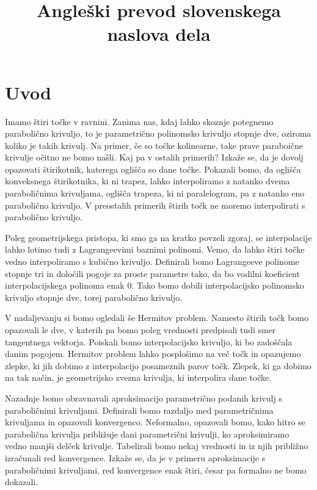 \documentclass[mat1]{fmfdelo}
\title{Angleški prevod slovenskega naslova dela}
\begin{document}

\section{Uvod}

Imamo štiri točke v ravnini. Zanima nas, kdaj lahko skoznje potegnemo parabolično krivuljo, to je parametrično polinomsko krivuljo stopnje dve, oziroma koliko je takih krivulj. Na primer, če so točke kolinearne, take prave paraboične krivulje očitno ne bomo našli. Kaj pa v ostalih primerih? Izkaže se, da je dovolj opazovati štirikotnik, katerega oglišča so dane točke. Pokazali bomo, da oglišča konveksnega štirikotnika, ki ni trapez, lahko interpoliramo z natanko dvema paraboličnima krivuljama, oglišča trapeza, ki ni paralelogram, pa z natanko eno parabolično krivuljo. V preostalih primerih štirih točk ne moremo interpolirati s parabolično krivuljo.


Poleg geometrijskega pristopa, ki smo ga na kratko povzeli zgoraj, se interpolacije lahko lotimo tudi z Lagrangeevimi baznimi polinomi. Vemo, da lahko štiri točke vedno interpoliramo s kubično krivuljo. Definirali bomo Lagrangeeve polinome stopnje tri in določili pogoje za proste parametre tako, da bo vodilni koeficient interpolacijskega polinoma enak $0$. Tako bomo dobili interpolacijsko polinomsko krivuljo stopnje dve, torej parabolično krivuljo.


V nadaljevanju si bomo ogledali še Hermitov problem. Namesto štirih točk bomo opazovali le dve, v katerih pa bomo poleg vrednosti predpisali tudi smer tangentnega vektorja. Poiskali bomo interpolacijsko krivuljo, ki bo zadoščala danim pogojem. Hermitov problem lahko posplošimo na več točk in opazujemo zlepke, ki jih dobimo z interpolacijo posameznih parov točk. Zlepek, ki ga dobimo na tak način, je geometrijsko zvezna krivulja, ki interpolira dane točke. 

Nazadnje bomo obravnavali aproksimacijo parametrično podanih krivulj s paraboličnimi krivuljami. Definirali bomo razdaljo med parametričnima krivuljama in opazovali konvergenco. Neformalno, opazovali bomo, kako hitro se parabolična krivulja približuje dani parametrični krivulji, ko aproksimiramo vedno manjši delček krivulje. Tabelirali bomo nekaj vrednosti in iz njih približno izračunali red konvergence. Izkaže se, da je v primeru aproksimacije s paraboličnimi krivuljami, red konvergence enak štiri, česar pa formalno ne bomo dokazali.
\end{document}
